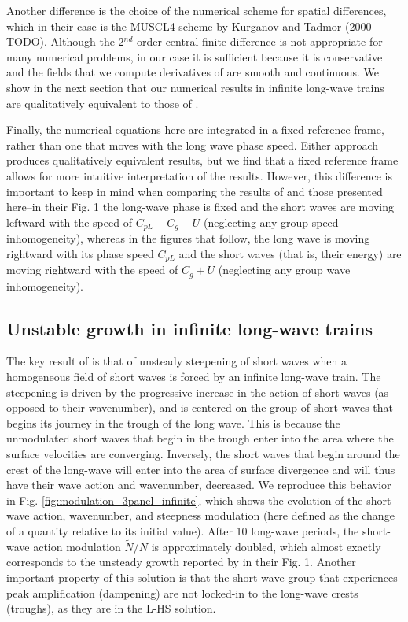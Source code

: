\documentclass[draft]{agujournal2019}
\begin{document}
Another difference is the choice of the numerical scheme for spatial differences,
which in their case is the MUSCL4 scheme by Kurganov and Tadmor (2000 TODO).
Although the 2$^{nd}$ order central finite difference is not appropriate for many
numerical problems, in our case it is sufficient because it is conservative and
the fields that we compute derivatives of are smooth and continuous.
We show in the next section that our numerical results in infinite long-wave
trains are qualitatively equivalent to those of .

Finally, the numerical equations here are integrated in a fixed reference frame,
rather than one that moves with the long wave phase speed.
Either approach produces qualitatively equivalent results, but we find that
a fixed reference frame allows for more intuitive interpretation of the results.
However, this difference is important to keep in mind when comparing the results
of  and those presented here--in their Fig. 1 the
long-wave phase is fixed and the short waves are moving leftward
with the speed of $C_{pL} - C_g - U$ (neglecting any group speed inhomogeneity),
whereas in the figures that follow, the long wave is moving rightward with its
phase speed $C_{pL}$ and the short waves (that is, their energy) are moving
rightward with the speed of $C_g + U$ (neglecting any group wave inhomogeneity).

\subsection{Unstable growth in infinite long-wave trains}
\label{subsection:unstable_growth}

The key result of  is that of unsteady steepening of
short waves when a homogeneous field of short waves is forced by an infinite
long-wave train.
The steepening is driven by the progressive increase in the action of short
waves (as opposed to their wavenumber), and is centered on the group of short
waves that begins its journey in the trough of the long wave.
This is because the unmodulated short waves that begin in the trough enter into
the area where the surface velocities are converging.
Inversely, the short waves that begin around the crest of the long-wave will
enter into the area of surface divergence and will thus have their wave action
and wavenumber, decreased.
We reproduce this behavior in Fig. \ref{fig:modulation_3panel_infinite}, which
shows the evolution of the short-wave action, wavenumber, and steepness
modulation (here defined as the change of a quantity relative to its initial value).
After 10 long-wave periods, the short-wave action modulation $\widetilde{N}/N$
is approximately doubled, which almost exactly corresponds to the unsteady growth
reported by  in their Fig. 1.
Another important property of this solution is that the short-wave group that
experiences peak amplification (dampening) are not locked-in to the long-wave
crests (troughs), as they are in the L-HS solution.
\end{document}
